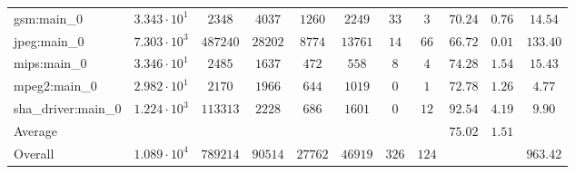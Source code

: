 \begin{tabular}{|l|c|c|c|c|c|c|c|c|c|c|}
gsm:main\_0             & $ 3.343 \cdot 10^{1} $ & $ 2348   $ & $ 4037  $ & $ 1260  $ & $ 2249  $ & $ 33  $ & $ 3   $ & $ 70.24       $ & $ 0.76    $ & $ 14.54   $ \\
jpeg:main\_0            & $ 7.303 \cdot 10^{3} $ & $ 487240 $ & $ 28202 $ & $ 8774  $ & $ 13761 $ & $ 14  $ & $ 66  $ & $ 66.72       $ & $ 0.01    $ & $ 133.40  $ \\
mips:main\_0            & $ 3.346 \cdot 10^{1} $ & $ 2485   $ & $ 1637  $ & $ 472   $ & $ 558   $ & $ 8   $ & $ 4   $ & $ 74.28       $ & $ 1.54    $ & $ 15.43   $ \\
mpeg2:main\_0           & $ 2.982 \cdot 10^{1} $ & $ 2170   $ & $ 1966  $ & $ 644   $ & $ 1019  $ & $ 0   $ & $ 1   $ & $ 72.78       $ & $ 1.26    $ & $ 4.77    $ \\
sha\_driver:main\_0     & $ 1.224 \cdot 10^{3} $ & $ 113313 $ & $ 2228  $ & $ 686   $ & $ 1601  $ & $ 0   $ & $ 12  $ & $ 92.54       $ & $ 4.19    $ & $ 9.90    $ \\
\hline
Average                 & $                    $ & $        $ & $       $ & $       $ & $       $ & $     $ & $     $ & $ 75.02       $ & $ 1.51    $ & $         $ \\
\hline
Overall                 & $ 1.089 \cdot 10^{4} $ & $ 789214 $ & $ 90514 $ & $ 27762 $ & $ 46919 $ & $ 326 $ & $ 124 $ & $             $ & $         $ & $ 963.42  $ \\
\hline
\end{tabular}
